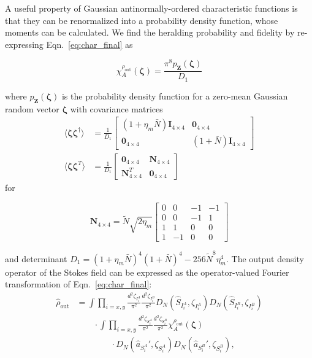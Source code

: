 \documentclass[aps,twocolumn,secnumarabic,amsmath,amssymb,pra,groupedaddress,
showpacs, showkeys]{revtex4-1}
\newcommand{\pna}[1]{\left(#1\right)}
\newcommand{\eqn}[1]{
\begin{equation}
	#1
\end{equation}
}
\begin{document}
A useful property of Gaussian antinormally-ordered characteristic functions is
that they can be renormalized into a probability density function, whose
moments can be calculated. We find the heralding probability and fidelity by
re-expressing Eqn.~\ref{eq:char_final} as
\eqn{
\chi_A^{\rho_{\textrm{out}}}\pna{\bm{\zeta}}=\frac{\pi^8 p_{\mathbf{Z}}\pna{\bm{\zeta}}}{D_1}
}
where $p_{\mathbf{Z}}\pna{\bm{\zeta}}$ is the probability density function for
a zero-mean Gaussian random vector $\bm{\zeta}$ with covariance matrices
\begin{align}
\langle \bm{\zeta}\bm{\zeta}^{\dagger}\rangle&=\frac{1}{D_1}\left[ 
\begin{array}{cc}
\pna{1+\eta_{m} \bar{N}} \mathbf{I}_{4\times 4} &  \mathbf{0}_{4\times 4} \\
 \mathbf{0}_{4\times 4} & \pna{1+\bar{N}} \mathbf{I}_{4\times 4}
\end{array} 
\right] \nonumber \\
\langle \bm{\zeta}\bm{\zeta}^{T}\rangle&=\frac{1}{D_1}\left[ 
\begin{array}{cc}
 \mathbf{0}_{4\times 4} & \mathbf{N}_{4\times 4} \\
 \mathbf{N}_{4\times 4}^T & \mathbf{0}_{4\times 4}
\end{array} 
\right]\label{eq:chap3:moments}
\end{align}
for 
\eqn{
\mathbf{N}_{4\times 4}=\tilde{N}\sqrt{2\eta_{m}}\left[ 
\begin{array}{cccc}
0 & 0 & -1 & -1\\
0 & 0 & -1 & 1\\
1 & 1 & 0 & 0\\
1 & -1 & 0 & 0
\end{array} 
\right]
}
and determinant $D_1=\pna{1+\eta_{m} \bar{N}}^4
\pna{1+\bar{N}}^4-256 \tilde{N}^8 \eta_{m}^4$. The output density
operator of the Stokes field can be expressed as the operator-valued Fourier
transformation of Eqn.~\ref{eq:char_final}:
\begin{align}
\hat{\rho}_{\textrm{out}}& =\int 
\prod_{i=x,y}
\frac{d^2 \zeta_{I_i^A}}{\pi^2} 
\frac{d^2 \zeta_{I_i^B}}{\pi^2} 
D_N\pna{\hat{S}_{I_i^A},\zeta_{I_i^A}} 
D_N\pna{\hat{S}_{I_i^B},\zeta_{I_i^B}}  \nonumber \\
& \qquad \cdot \int 
\prod_{i=x,y}
\frac{d^2 \zeta_{S_i^A}}{\pi^2} 
\frac{d^2 \zeta_{S_i^B}}{\pi^2}
\chi_A^{\rho_{\textrm{out}}}\pna{\bm{\zeta}} \nonumber \\
&\qquad \qquad \cdot D_N\pna{\hat{a}_{S_i^A}',\zeta_{S_i^A}} 
D_N\pna{\hat{a}_{S_i^B}',\zeta_{S_i^B}},
\label{eq:fourier_char}
\end{align}
\end{document}
